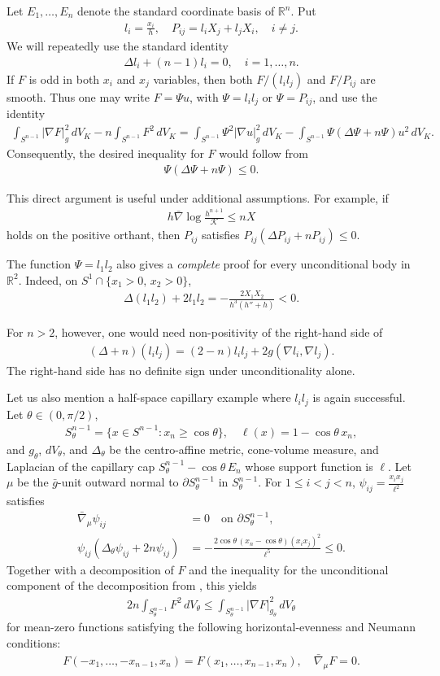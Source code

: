 \documentclass[12pt]{amsart}
\newcommand{\R}{\mathbb{R}}
\newcommand{\Sn}{S^{n-1}}
\newcommand{\abs}[1]{\left|#1\right|}
\newcommand{\eq}[1]{\begin{equation}\begin{alignedat}{2}#1\end{alignedat}\end{equation}}
\theoremstyle{plain}
\theoremstyle{definition}
\theoremstyle{remark}
\numberwithin{equation}{section}
\begin{document}
Let $E_1,\ldots,E_n$ denote the standard coordinate basis of $\R^n$.  Put
\eq{
 l_i=\frac{x_i}{h},\quad P_{ij}=l_iX_j+l_jX_i,\quad i\ne j.
}
We will repeatedly use the standard identity
\eq{\label{eq:conormal-identity}
 \Delta l_i+(n-1)l_i=0,\quad i=1,\ldots,n.
}
If $F$ is odd in both $x_i$ and $x_j$ variables, then both $F/(l_il_j)$ and $F/P_{ij}$ are smooth. Thus one may write $F=\Psi u$, with $\Psi=l_il_j$ or $\Psi=P_{ij}$, and use the identity
\eq{
\int_{\Sn}\abs{\nabla F}_g^2\,dV_K-n\int_{\Sn}F^2\,dV_K
=\int_{\Sn}\Psi^2\abs{\nabla u}_g^2\,dV_K-\int_{\Sn}\Psi(\Delta\Psi+n\Psi)u^2\,dV_K.
}
Consequently, the desired inequality for $F$ would follow from
\eq{
 \Psi(\Delta\Psi+n\Psi)\le 0.
}

This direct argument is useful under additional assumptions. For example, if
\eq{
 h\bar{\nabla}\log\frac{h^{n+1}}{\mathcal{K}}\le nX
}
holds on the positive orthant, then $P_{ij}$ satisfies
$P_{ij}(\Delta P_{ij}+nP_{ij})\le 0$. 

The function $\Psi=l_1l_2$ also gives a \emph{complete}  proof for every unconditional body in $\R^2$. Indeed, on $S^1\cap\{x_1>0,\,x_2>0\}$,
\eq{
 \Delta(l_1l_2)+2l_1l_2=-\frac{2X_1X_2}{h^3(h''+h)}<0.
}

For $n>2$, however, one would need non-positivity of the right-hand side of
\eq{
(\Delta+n)(l_il_j)
=(2-n)l_il_j+2g(\nabla l_i,\nabla l_j).
}
The right-hand side has no definite sign under unconditionality alone.


Let us also mention a half-space capillary example where $l_il_j$ is again successful. Let $\theta\in(0,\pi/2)$,
\eq{
 \Sn_{\theta}=\{x\in\Sn:x_n\ge\cos\theta\},\quad
 \ell(x)=1-\cos\theta\,x_n,
}
and $g_{\theta}$, $dV_{\theta}$, and $\Delta_{\theta}$ be the centro-affine metric, cone-volume measure, and Laplacian of the capillary cap $ \Sn_{\theta}-\cos\theta\, E_n$ whose support function is $\ell$. Let $\mu$ be the $\bar{g}$-unit outward normal to $\partial\Sn_{\theta}$ in $\Sn_{\theta}$. For $1\le i<j<n$, $ \psi_{ij}=\frac{x_ix_j}{\ell^2}$ satisfies
\eq{
 \bar{\nabla}_{\mu}\psi_{ij}&=0\quad\text{on }\partial\Sn_{\theta},\\
 \psi_{ij}(\Delta_{\theta}\psi_{ij}+2n\psi_{ij})
 &=-\frac{2\cos\theta\,(x_n-\cos\theta)(x_ix_j)^2}{\ell^5}\le 0.
}
Together with a decomposition of $F$ and the inequality for the unconditional component of the decomposition from \cite[Thm. 1.2]{CHI26}, this yields
\eq{
 2n\int_{\Sn_{\theta}}F^2\,dV_{\theta}
 \le\int_{\Sn_{\theta}}\abs{\nabla F}_{g_{\theta}}^2\,dV_{\theta}
}
for mean-zero functions satisfying the following horizontal-evenness and Neumann conditions:
\eq{
 F(-x_1,\ldots,-x_{n-1},x_n)=F(x_1,\ldots,x_{n-1},x_n),\quad \bar{\nabla}_{\mu}F=0.
}
\end{document}
